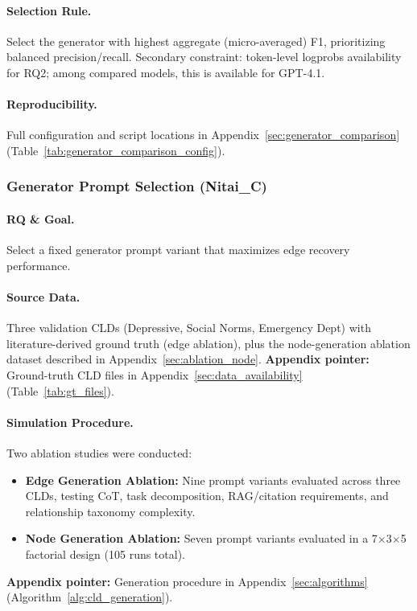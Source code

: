 \paragraph{Selection Rule.}
Select the generator with highest aggregate (micro-averaged) F1, prioritizing balanced precision/recall. Secondary constraint: token-level logprobs availability for RQ2; among compared models, this is available for GPT-4.1.

\paragraph{Reproducibility.}
Full configuration and script locations in Appendix~\ref{sec:generator_comparison} (Table~\ref{tab:generator_comparison_config}).

\subsubsection{Generator Prompt Selection (Nitai\_C)}

\paragraph{RQ \& Goal.}
Select a fixed generator prompt variant that maximizes edge recovery performance.

\paragraph{Source Data.}
Three validation CLDs (Depressive, Social Norms, Emergency Dept) with literature-derived ground truth (edge ablation), plus the node-generation ablation dataset described in Appendix~\ref{sec:ablation_node}.
\textbf{Appendix pointer:} Ground-truth CLD files in Appendix~\ref{sec:data_availability} (Table~\ref{tab:gt_files}).

\paragraph{Simulation Procedure.}
Two ablation studies were conducted:
\begin{itemize}[noitemsep]
    \item \textbf{Edge Generation Ablation:} Nine prompt variants evaluated across three CLDs, testing CoT, task decomposition, RAG/citation requirements, and relationship taxonomy complexity.
    \item \textbf{Node Generation Ablation:} Seven prompt variants evaluated in a 7$\times$3$\times$5 factorial design (105 runs total).
\end{itemize}
\textbf{Appendix pointer:} Generation procedure in Appendix~\ref{sec:algorithms} (Algorithm~\ref{alg:cld_generation}).

